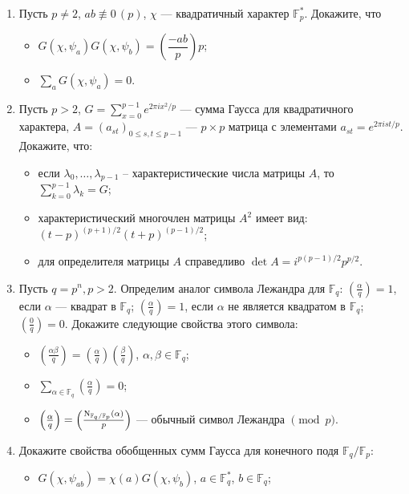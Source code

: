 \begin{enumerate}[topsep=0pt]
    \item Пусть $p\neq 2$, $ab\not\equiv 0\,(p)$, $\chi$ --- квадратичный характер $\mathbb{F}_p^*$. Докажите, что
    \begin{itemize}[topsep=0pt]
        \item $G(\chi,\psi_a)G(\chi,\psi_b) = \left(\dfrac{-ab}{p}\right) p$; %
        \item $\sum_a G(\chi,\psi_a)=0$. %
    \end{itemize}
    \item Пусть $p>2$, $G = \sum_{x=0}^{p-1} e^{2\pi i x^2/p}$ --- сумма Гаусса для квадратичного характера, $A = (a_{st})_{0\leqslant s,t \leqslant p-1}$ --- $p\times p$ матрица с элементами $a_{st}=e^{2\pi i st/p}$. Докажите, что:
    \begin{itemize}[topsep=0pt]
        \item если $\lambda_0,\dots,\lambda_{p-1}$ – характеристические числа матрицы $A$, то $\sum_{k=0}^{p-1} \lambda_k = G$;
        \item характеристический многочлен матрицы $A^2$ имеет вид: $(t-p)^{(p+1)/2} (t+p)^{(p-1)/2}$;
        \item для определителя матрицы $A$ справедливо $\det A = i^{p(p-1)/2}p^{p/2}$.
    \end{itemize} %
    \item Пусть $q=p^n, p>2$. Определим аналог символа Лежандра для $\mathbb{F}_q$: $\left(\frac{\alpha}{q}\right)=1$, если $\alpha$ --- квадрат в $\mathbb{F}_q$; $\left(\frac{\alpha}{q}\right)=1$, если $\alpha$ не является квадратом в $\mathbb{F}_q$; $\left(\frac{0}{q}\right)=0$. Докажите следующие свойства этого символа: 
    \begin{itemize} [topsep=0pt]
        \item $\left(\frac{\alpha\beta}{q}\right) = \left(\frac{\alpha}{q}\right)\left(\frac{\beta}{q}\right)$, $\alpha, \beta \in \mathbb{F}_q$; 
        \item $\sum_{\alpha\in\mathbb{F}_q} \left(\frac{\alpha}{q}\right) = 0$; 
        \item $\left(\frac{\alpha}{q}\right)=\left(\frac{\operatorname{N}_{\mathbb{F}_q/\mathbb{F}_p}(\alpha)}{p}\right)$ --- обычный символ Лежандра $\pmod p$.
    \end{itemize} %
    \item Докажите свойства обобщенных сумм Гаусса для конечного подя $\mathbb{F}_q/\mathbb{F}_p$:
    \begin{itemize}[topsep=0pt]
        \item $G(\chi,\psi_{ab})=\chi(a) G(\chi, \psi_b)$, $a\in\mathbb{F}_q^*$, $b\in \mathbb{F}_q$;

\end{itemize}
\end{enumerate}
